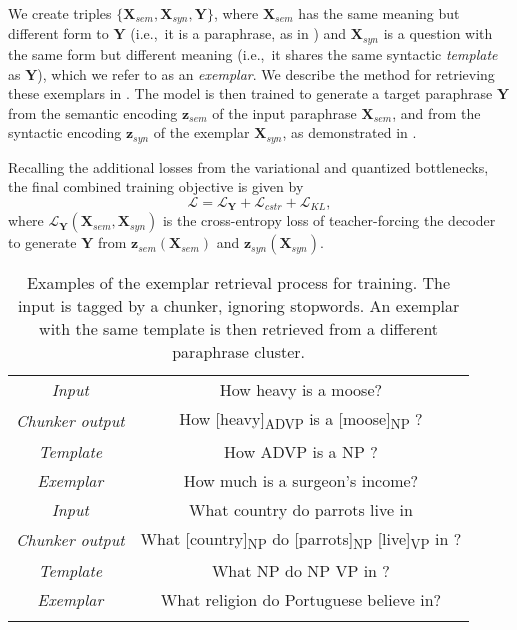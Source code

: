 \documentclass[11pt,a4paper]{article}
\begin{document}
We create triples $\{\textbf{X}_{sem}, \textbf{X}_{syn},
\textbf{Y}\}$, where $\textbf{X}_{sem}$ has the same meaning but
different form to $\textbf{Y}$ (i.e.,~it is a paraphrase, as in
) and $\textbf{X}_{syn}$ is a question with the same
form but different meaning (i.e.,~it shares the same syntactic
\textit{template} as $\textbf{Y}$), which we refer to as an
\textit{exemplar}. We describe the method for retrieving these
exemplars in . The model is then trained to
generate a target paraphrase $\textbf{Y}$ from the semantic encoding
$\textbf{z}_{sem}$ of the input paraphrase $\textbf{X}_{sem}$, and
from the syntactic encoding $\textbf{z}_{syn}$ of the exemplar
$\textbf{X}_{syn}$, as demonstrated in .

Recalling the additional losses from the variational and quantized
bottlenecks, the final combined training objective is given by
\begin{equation}
    \mathcal{L} = \mathcal{L}_{\textbf{Y}} + \mathcal{L}_{cstr} + \mathcal{L}_{KL},
\end{equation}
where $\mathcal{L}_{\textbf{Y}}(\textbf{X}_{sem}, \textbf{X}_{syn})$ is the cross-entropy loss of teacher-forcing the decoder to generate $\textbf{Y}$ from $\textbf{z}_{sem}(\textbf{X}_{sem})$ and  $\textbf{z}_{syn}(\textbf{X}_{syn})$.













\begin{table}[t!]
    \small
    \centering
    \begin{tabular}{@{}c@{~}|@{~}c@{}}
    
    \hhline{==}
        \textit{Input} & How heavy is a moose? \\
\textit{Chunker output} & How [heavy]\textsubscript{ADVP} is a [moose]\textsubscript{NP} ? \\
\textit{Template} & How ADVP is a NP ? \\
\textit{Exemplar} & How much is a surgeon's income? \\
    \hhline{==}
        \textit{Input} & What country do parrots live in \\
\textit{Chunker output} & What [country]\textsubscript{NP} do  [parrots]\textsubscript{NP} [live]\textsubscript{VP} in ? \\
\textit{Template} & What NP do NP VP in ? \\
\textit{Exemplar} & What religion do Portuguese believe in? \\
     \hhline{==}
    \end{tabular}
\vspace*{-.1cm}
    \caption{Examples of the exemplar retrieval process for training. The input is tagged by a chunker, ignoring stopwords. An exemplar with the same template is then retrieved from a different paraphrase cluster.}
    \label{tab:templateexample}
\end{table}
\end{document}
